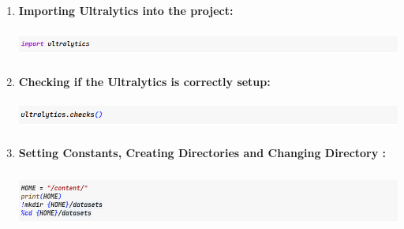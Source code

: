 \documentclass[12 pt]{report}
\begin{document}
{\begin{enumerate}
    \item \textbf{Importing Ultralytics into the project:}
          \begin{center}
            \includegraphics[width=17cm, height=1cm]{import ultralatics.png}
          \end{center}

    \item \textbf{Checking if the Ultralytics is correctly setup:}
          \begin{center}
            \includegraphics[width=17cm, height=1cm]{check ultralatics.png}
          \end{center}

    \item \textbf{Setting Constants, Creating Directories and Changing Directory :}
          \begin{center}
            \includegraphics[width=17cm, height=2cm]{creating home and dataset folder.png}
          \end{center}
  \end{enumerate}
 }
\end{document}
